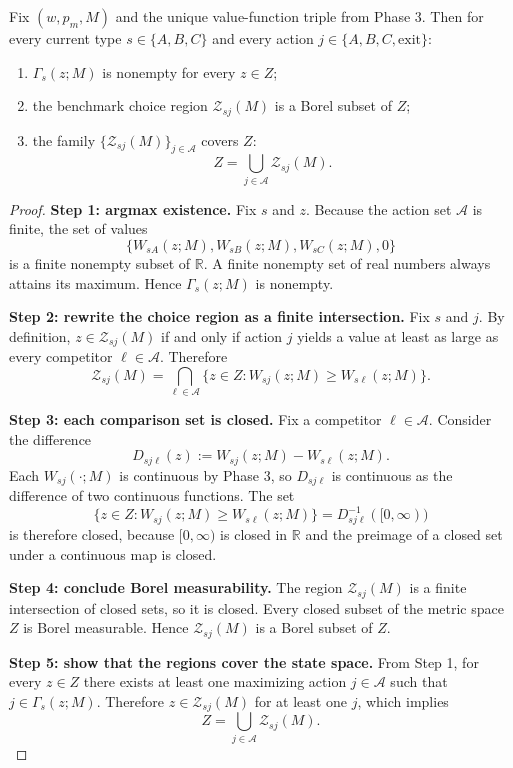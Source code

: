 \begin{proposition}
Fix $(w,p_m,M)$ and the unique value-function triple from Phase 3. Then for every current type $s\in\{A,B,C\}$ and every action $j\in\{A,B,C,\mathrm{exit}\}$:
\begin{enumerate}
    \item $\Gamma_s(z;M)$ is nonempty for every $z\in Z$;
    \item the benchmark choice region $\mathcal Z_{sj}(M)$ is a Borel subset of $Z$;
    \item the family $\{\mathcal Z_{sj}(M)\}_{j\in\mathcal A}$ covers $Z$:
    \[
    Z=\bigcup_{j\in\mathcal A}\mathcal Z_{sj}(M).
    \]
\end{enumerate}
\end{proposition}

\begin{proof}
\medskip\noindent\textbf{Step 1: argmax existence.}
Fix $s$ and $z$. Because the action set $\mathcal A$ is finite, the set of values
\[
\{W_{sA}(z;M),W_{sB}(z;M),W_{sC}(z;M),0\}
\]
is a finite nonempty subset of $\mathbb R$. A finite nonempty set of real numbers always attains its maximum. Hence $\Gamma_s(z;M)$ is nonempty.

\medskip\noindent\textbf{Step 2: rewrite the choice region as a finite intersection.}
Fix $s$ and $j$. By definition, $z\in\mathcal Z_{sj}(M)$ if and only if action $j$ yields a value at least as large as every competitor $\ell\in\mathcal A$. Therefore
\[
\mathcal Z_{sj}(M)
=
\bigcap_{\ell\in\mathcal A}
\{z\in Z: W_{sj}(z;M)\ge W_{s\ell}(z;M)\}.
\]

\medskip\noindent\textbf{Step 3: each comparison set is closed.}
Fix a competitor $\ell\in\mathcal A$. Consider the difference
\[
D_{sj\ell}(z):=W_{sj}(z;M)-W_{s\ell}(z;M).
\]
Each $W_{sj}(\cdot;M)$ is continuous by Phase 3, so $D_{sj\ell}$ is continuous as the difference of two continuous functions. The set
\[
\{z\in Z: W_{sj}(z;M)\ge W_{s\ell}(z;M)\}
=
D_{sj\ell}^{-1}([0,\infty))
\]
is therefore closed, because $[0,\infty)$ is closed in $\mathbb R$ and the preimage of a closed set under a continuous map is closed.

\medskip\noindent\textbf{Step 4: conclude Borel measurability.}
The region $\mathcal Z_{sj}(M)$ is a finite intersection of closed sets, so it is closed. Every closed subset of the metric space $Z$ is Borel measurable. Hence $\mathcal Z_{sj}(M)$ is a Borel subset of $Z$.

\medskip\noindent\textbf{Step 5: show that the regions cover the state space.}
From Step 1, for every $z\in Z$ there exists at least one maximizing action $j\in\mathcal A$ such that $j\in\Gamma_s(z;M)$. Therefore $z\in\mathcal Z_{sj}(M)$ for at least one $j$, which implies
\[
Z=\bigcup_{j\in\mathcal A}\mathcal Z_{sj}(M).
\]
\end{proof}

